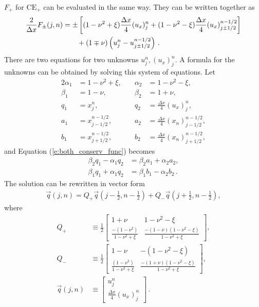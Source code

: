 \documentclass[11pt,dvips]{article}
\numberwithin{equation}{section}
\begin{document}
$F_+$ for $\mathrm{CE}_+$ can be evaluated in the same way.  They can be
written together as
\begin{align}
  \frac{2}{\Delta x}F_{\pm}(j,n) &=
    \pm\left[
        (1-\nu^2+\xi)\frac{\Delta x}{4}(u_x)_j^n
      + (1-\nu^2-\xi)\frac{\Delta x}{4}(u_x)_{j\pm1/2}^{n-1/2}
    \right] \notag \\
  &\quad\quad
  + (1\mp\nu)\left(u_j^n-u_{j\pm1/2}^{n-1/2}\right)\,.
    \label{e:both_conserv_func}
\end{align}
There are two equations for two unknowns $u_j^n, (u_x)_j^n$.  A formula for the
unknowns can be obtained by solving this system of equations.  Let
\begin{alignat*}{2}
  \alpha_1 &= 1-\nu^2+\xi,\quad &\alpha_2 &= 1-\nu^2-\xi, \\
  \beta_1 &= 1-\nu, &\beta_2 &= 1+\nu, \\
  q_1 &= x_j^n, &q_2 &= \frac{\Delta x}{4}(u_x)_j^n, \\
  a_1 &= x_{j-1/2}^{n-1/2},
 &a_2 &= \frac{\Delta x}{4}(x_n)_{j-1/2}^{n-1/2}, \\
  b_1 &= x_{j+1/2}^{n-1/2},
 &b_2 &= \frac{\Delta x}{4}(x_n)_{j+1/2}^{n-1/2},
\end{alignat*}
and Equation (\ref{e:both_conserv_func}) becomes
\begin{align*}
  \beta_2q_1 - \alpha_1q_2 &= \beta_2a_1 + \alpha_2a_2, \\
  \beta_1q_1 + \alpha_1q_2 &= \beta_1b_1 - \alpha_2b_2\,.
\end{align*}
The solution can be rewritten in vector form
\begin{align*}
  \vec{q}(j,n) =
    Q_+\vec{q}(j-\frac{1}{2},n-\frac{1}{2})
  + Q_-\vec{q}(j+\frac{1}{2},n-\frac{1}{2}),
\end{align*}
where
\begin{align*}
  Q_+ &\equiv
    \frac{1}{2}
    \left[\begin{array}{cc}
      1+\nu                                     &
      1-\nu^2-\xi                               \\
      \frac{-(1-\nu^2)}{1-\nu^2+\xi}            &
      \frac{-(1-\nu)(1-\nu^2-\xi)}{1-\nu^2+\xi}
    \end{array}\right], \\
  Q_- &\equiv
    \frac{1}{2}
    \left[\begin{array}{cc}
      1-\nu                                     &
      -(1-\nu^2-\xi)                            \\
      \frac{(1-\nu^2)}{1-\nu^2+\xi}             &
      \frac{-(1+\nu)(1-\nu^2-\xi)}{1-\nu^2+\xi}
    \end{array}\right], \\
  \vec{q}(j,n) &\equiv
    \left[\begin{array}{c}
      u_j^n \\ \frac{\Delta x}{4}(u_x)_j^n
    \end{array}\right]\,.
\end{align*}
\end{document}
